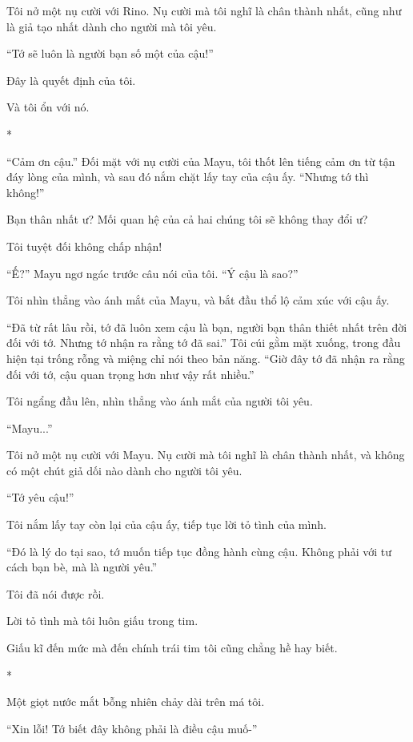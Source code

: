{    Tôi nở một nụ cười với Rino. Nụ cười mà tôi nghĩ là chân thành nhất,
    cũng như là giả tạo nhất dành cho người mà tôi yêu.

    ``Tớ sẽ luôn là người bạn số một của cậu!''

    Đây là quyết định của tôi.

    Và tôi ổn với nó.

    *

    ``Cảm ơn cậu.'' Đối mặt với nụ cười của Mayu, tôi thốt lên tiếng cảm ơn
    từ tận đáy lòng của mình, và sau đó nắm chặt lấy tay của cậu ấy. ``Nhưng
    tớ thì không!''

    Bạn thân nhất ư? Mối quan hệ của cả hai chúng tôi sẽ không thay đổi ư?

    Tôi tuyệt đối không chấp nhận!

    ``Ế?'' Mayu ngơ ngác trước câu nói của tôi. ``Ý cậu là sao?''

    Tôi nhìn thẳng vào ánh mắt của Mayu, và bắt đầu thổ lộ cảm xúc với cậu
    ấy.

    ``Đã từ rất lâu rồi, tớ đã luôn xem cậu là bạn, người bạn thân thiết
    nhất trên đời đối với tớ. Nhưng tớ nhận ra rằng tớ đã sai.'' Tôi cúi gằm
    mặt xuống, trong đầu hiện tại trống rỗng và miệng chỉ nói theo bản năng.
    ``Giờ đây tớ đã nhận ra rằng đối với tớ, cậu quan trọng hơn như vậy rất
    nhiều.''

    Tôi ngẩng đầu lên, nhìn thẳng vào ánh mắt của người tôi yêu.

    ``Mayu...''

    Tôi nở một nụ cười với Mayu. Nụ cười mà tôi nghĩ là chân thành nhất, và
    không có một chút giả dối nào dành cho người tôi yêu.

    ``Tớ yêu cậu!''

    Tôi nắm lấy tay còn lại của cậu ấy, tiếp tục lời tỏ tình của mình.

    ``Đó là lý do tại sao, tớ muốn tiếp tục đồng hành cùng cậu. Không phải
    với tư cách bạn bè, mà là người yêu.''

    Tôi đã nói được rồi.

    Lời tỏ tình mà tôi luôn giấu trong tim.

    Giấu kĩ đến mức mà đến chính trái tim tôi cũng chẳng hề hay biết.

    *

    Một giọt nước mắt bỗng nhiên chảy dài trên má tôi.

    ``Xin lỗi! Tớ biết đây không phải là điều cậu muố-''

}

